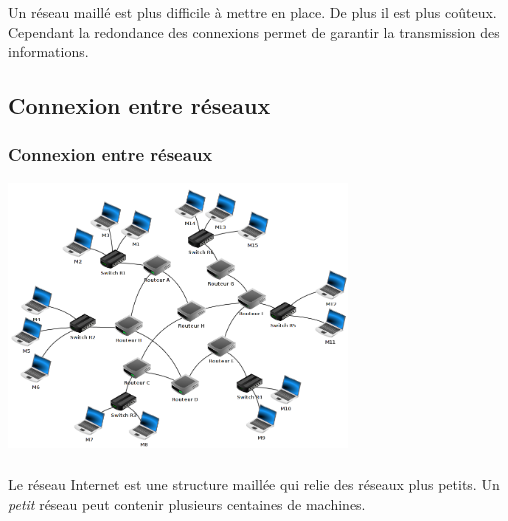 \documentclass[svgnames,11pt]{beamer}
\begin{document}
\begin{frame}
    \frametitle{}

    \begin{aretenir}[]
    Un réseau maillé est plus difficile à mettre en place. De plus il est plus coûteux. Cependant la redondance des connexions permet de garantir la transmission des informations.
    \end{aretenir}

\end{frame}
\subsection{Connexion entre réseaux}
\begin{frame}
    \frametitle{Connexion entre réseaux}

    \begin{center}
    \centering
    \includegraphics[width=9cm]{ressources/routage.png}
    \label{IMG}
    \end{center}

\end{frame}
\begin{frame}
    \frametitle{}

    \begin{aretenir}[]
    Le réseau Internet est une structure maillée qui relie des réseaux plus petits. Un \emph{petit} réseau peut contenir plusieurs centaines de machines.
    \end{aretenir}

\end{frame}
\end{document}
